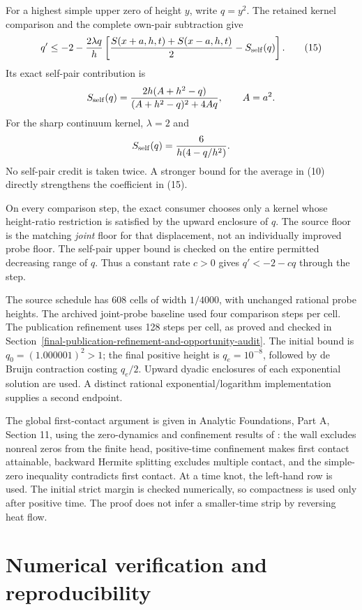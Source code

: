 \documentclass[11pt,a4paper]{article}
\begin{document}
For a highest simple upper zero of height \(y\), write \(q=y^2\). The retained
kernel comparison and the complete own-pair subtraction give
\[
 q'\le-2-\frac{2\lambda q}{h}
       \left[\frac{S(x+a,h,t)+S(x-a,h,t)}2
                         -S_{\rm self}(q)\right].
\tag{15}
\]
Its exact self-pair contribution is
\[
 S_{\rm self}(q)=
 \frac{2h(A+h^2-q)}{(A+h^2-q)^2+4Aq},\qquad A=a^2.
\]
For the sharp continuum kernel, \(\lambda=2\) and
\[
 S_{\rm self}(q)=\frac6{h(4-q/h^2)}.
\]
No self-pair credit is taken twice. A stronger bound for the average in
(10) directly strengthens the coefficient in (15).

On every comparison step, the exact consumer chooses only a kernel whose
height-ratio restriction is satisfied by the upward enclosure of \(q\).
The source floor is the matching \emph{joint} floor for that displacement, not
an individually improved probe floor. The self-pair upper bound is checked
on the entire permitted decreasing range of \(q\). Thus a constant rate
\(c>0\) gives \(q'<-2-cq\) through the step.

The source schedule has 608 cells of width \(1/4000\), with unchanged rational
probe heights. The archived joint-probe baseline used four comparison steps
per cell. The publication refinement uses 128 steps per cell, as proved and
checked in Section~\ref{final-publication-refinement-and-opportunity-audit}. The initial bound is \(q_0=(1.000001)^2>1\); the final positive height
is \(q_e=10^{-8}\), followed by de Bruijn contraction costing \(q_e/2\).
Upward dyadic enclosures of each exponential solution are used. A distinct
rational exponential/logarithm implementation supplies a second endpoint.

The global first-contact argument is given in Analytic Foundations,
Part A, Section 11, using the zero-dynamics and confinement results of
\cite[Proposition 3.1 and Theorem 1.5(i)]{polymath}:
the wall excludes nonreal zeros from the finite head, positive-time
confinement makes first contact attainable, backward Hermite splitting
excludes multiple contact, and the simple-zero inequality contradicts first
contact. At a time knot, the left-hand row is used. The initial strict margin
is checked numerically, so compactness is used only after positive time.
The proof does not infer a smaller-time strip by reversing heat flow.

\section{Numerical verification and reproducibility}\label{computation-reproducibility-and-trust-boundary}
\end{document}
